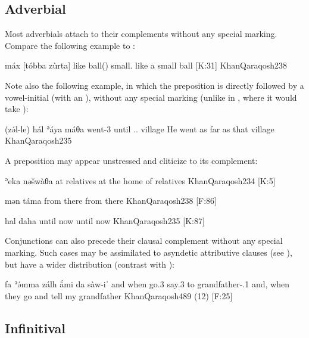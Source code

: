 \subsection{Adverbial \prims} \label{ss:Qar_jux_adv}

Most adverbials attach to their complements without any special marking. Compare the following example to :

{máx [tóbba zùrta]}
{like ball(\fem) small.\fem}
{like a small ball {[K:31]}}
{KhanQaraqosh}{238}

Note also the following example, in which the preposition is directly followed by a vowel-initial \dem* (with an  ), without any special marking (unlike in \JZax, where it would take ):

{(zə́l-le) hál ʾáya máθa}
{went-3\masc{} until \dem.\far.\fem{} village}
{He went as far as that village}
{KhanQaraqosh}{235}

\largerpage
A preposition may appear unstressed and cliticize to its complement:

{ʾeka\cb{}  nəšwàθa}
{at\cb{}  relatives}
{at the home of relatives}
{KhanQaraqosh}{234 {[K:5]}}

 

{mən\cb{}  táma}
{from\cb{}  there}
{from there}
{KhanQaraqosh}{238 {[F:86]}}\antipar
\newpage

{hal\cb{} daha}
{until\cb{} now}
{until now}
{KhanQaraqosh}{235 {[K:87]}}

Conjunctions can also precede their clausal complement without any special marking. Such cases may be assimilated to asyndetic attributive clauses (see ), but have a wider distribution (contrast with ):

{fa\cb{}  ʾə́mma zálh\cb{}  ắmi da\cb{}  sàw-iˈ}
{and\cb{}  when go.3\pl{}\cb{}  say.3\pl{} to\cb{}  grandfather-\poss.1\sg}
{and, when they go and tell my grandfather}
{KhanQaraqosh}{489 (12) {[F:25]}}\antipar 




		
\subsection{Infinitival \prims}

